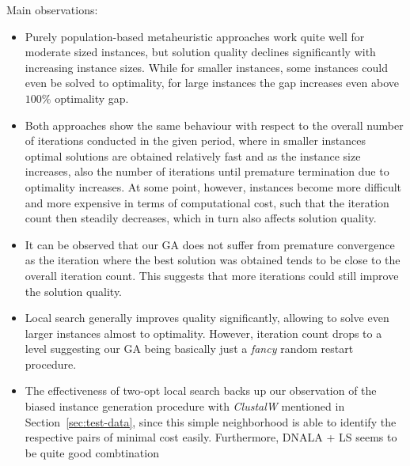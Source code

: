 \documentclass[12pt]{article}
\begin{document}
Main observations:
\begin{itemize}
	\item Purely population-based metaheuristic approaches work quite well for moderate sized instances, but solution quality declines significantly with increasing instance sizes. While for smaller instances, some instances could even be solved to optimality, for large instances the gap increases even above $100\%$ optimality gap. 
	\item Both approaches show the same behaviour with respect to the overall number of iterations conducted in the given period, where in smaller instances optimal solutions are obtained relatively fast and as the instance size increases, also the number of iterations until premature termination due to optimality increases. At some point, however, instances become more difficult and more expensive in terms of computational cost, such that the iteration count then steadily decreases, which in turn also affects solution quality. 
	\item It can be observed that our GA does not suffer from premature convergence as the iteration where the best solution was obtained tends to be close to the overall iteration count. This suggests that more iterations could still improve the solution quality. 
	\item Local search generally improves quality significantly, allowing to solve even larger instances almost to optimality. However, iteration count drops to a level suggesting our GA being basically just a \emph{fancy} random restart procedure. 
	\item The effectiveness of two-opt local search	backs up our observation of the biased instance generation procedure with \textit{ClustalW} mentioned in Section~\ref{sec:test-data}, since this simple neighborhood is able to identify the respective pairs of minimal cost easily. Furthermore, DNALA + LS seems to be quite good combtination 
\end{itemize}
\end{document}
